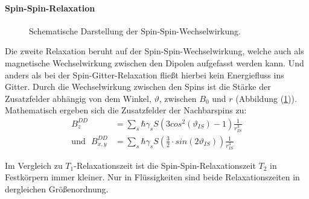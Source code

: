 \paragraph{Spin-Spin-Relaxation}
\begin{figure}
	\centering
	\vspace{-10pt}
	\caption{Schematische Darstellung der Spin-Spin-Wechselwirkung.}
	\label{SpinSpin}
\end{figure}
Die zweite Relaxation be{\-}ruht auf der Spin-Spin-Wechselwirkung, welche auch als magnetische Wechselwirkung zwischen den Dipolen aufgefasst werden kann.
Und anders als bei der Spin-Gitter-Relaxation flie{\ss}t hierbei kein Energiefluss ins Gitter.
Durch die Wechselwirkung zwischen den Spins ist die St\"{a}rke der Zusatzfelder abh\"{a}ngig von dem Winkel, $\vartheta$, zwischen $B_0$ und $r$ (Abbildung (\ref{SpinSpin})).
Mathematisch ergeben sich die Zusatzfelder der Nachbarspins zu:
\begin{align*}
	B_z^{DD} &= \sum_s \hbar \gamma_s S \left( 3 cos^2 \left(\vartheta_{IS}\right) - 1 \right) \frac{1}{r_{IS}^3} \\
	\text{und} \, \, \, \, B_{x,y}^{DD} &= \sum_s \hbar \gamma_s S \left( \frac{3}{2} \cdot sin\left(2 \vartheta_{IS}\right) \right) \frac{1}{r_{IS}^3} 
\end{align*}

Im Vergleich zu $T_1$-Relaxationszeit ist die Spin-Spin-Relaxationszeit $T_2$ in Festk\"{o}rpern immer kleiner.
Nur in Fl\"{u}ssigkeiten sind beide Relaxationszeiten in dergleichen Gr\"{o}{\ss}en{\-}ord{\-}nung.

